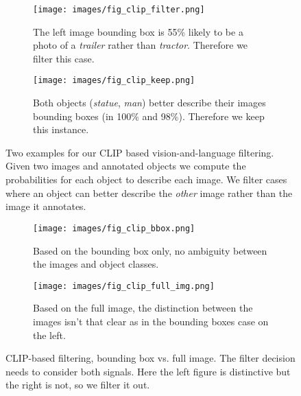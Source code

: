 \documentclass[letterpaper]{article} \usepackage{aaai23}  \usepackage{times}  \usepackage{helvet}  \usepackage{courier}  \usepackage[hyphens]{url}  \usepackage{graphicx} \urlstyle{rm} \def\UrlFont{\rm}  \usepackage{natbib}  \usepackage{caption} \frenchspacing  \setlength{\pdfpagewidth}{8.5in}  \setlength{\pdfpageheight}{11in}  \usepackage{algorithm}
\begin{document}
\begin{figure}[!t]
\centering
\begin{subfigure}{.49\textwidth}
  \centering
  \texttt{[image: images/fig\_clip\_filter.png]}
  \caption{The left image bounding box is 55\% likely to be a photo of a \emph{trailer} rather than \emph{tractor}. Therefore we filter this case.}
\end{subfigure}\hspace{2mm}
\begin{subfigure}{.47\textwidth}
  \centering
  \texttt{[image: images/fig\_clip\_keep.png]}
  \caption{Both objects (\emph{statue}, \emph{man}) better describe their images bounding boxes (in 100\% and 98\%). Therefore we keep this instance.}
\end{subfigure}
\caption{Two examples for our CLIP based vision-and-language filtering. Given two images and annotated objects we compute the probabilities for each object to describe each image. We filter cases where an object can better describe the \emph{other} image rather than the image it annotates.}
\label{fig:clip_filter}
\end{figure}

\begin{figure}[!t]
\begin{subfigure}{.48\textwidth}
  \texttt{[image: images/fig\_clip\_bbox.png]}
  \caption{Based on the bounding box only, no ambiguity between the images and object classes.}
\end{subfigure}\hspace{2mm}
\begin{subfigure}{.48\textwidth}
  \texttt{[image: images/fig\_clip\_full\_img.png]}
  \caption{Based on the full image, the distinction between the images isn't that clear as in the bounding boxes case on the left.}
\end{subfigure}
\caption{CLIP-based filtering, bounding box vs. full image. The filter decision needs to consider both signals. Here the left figure is distinctive but the right is not, so we filter it out.}
\label{fig:clip_filter_full_img}
\end{figure}
\end{document}
